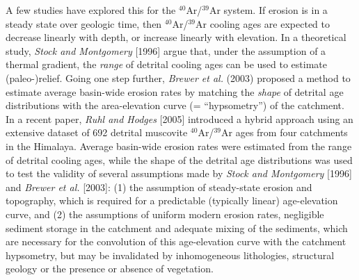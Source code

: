 \documentclass[12pt,twoside]{article}
\begin{document}
A few studies  have explored this for the  $^{40}$Ar/$^{39}$Ar system. 
If  erosion   is  in   a  steady  state   over  geologic   time,  then
$^{40}$Ar/$^{39}$Ar  cooling ages  are expected  to  decrease linearly
with  depth, or increase  linearly with  elevation.  In  a theoretical
study,  {\it  Stock  and  Montgomery}  [1996] argue  that,  under  the
assumption of a thermal gradient,  the {\it range} of detrital cooling
ages can be used to  estimate (paleo-)relief.  Going one step further,
{\it  Brewer et  al.}  (2003)  proposed a  method to  estimate average
basin-wide erosion rates  by matching the {\it shape}  of detrital age
distributions with the area-elevation  curve (= ``hypsometry'') of the
catchment.  In a recent paper, {\it Ruhl and Hodges} [2005] introduced
a hybrid approach using an extensive dataset of 692 detrital muscovite
$^{40}$Ar/$^{39}$Ar  ages  from  four  catchments  in  the  Himalaya.  
Average  basin-wide erosion  rates were  estimated from  the  range of
detrital  cooling   ages,  while  the   shape  of  the   detrital  age
distributions  was used to  test the  validity of  several assumptions
made by  {\it Stock  and Montgomery}  [1996] and {\it  Brewer et  al.} 
[2003]:  (1) the  assumption of  steady-state erosion  and topography,
which is  required for a predictable  (typically linear) age-elevation
curve,  and  (2) the  assumptions  of  uniform  modern erosion  rates,
negligible sediment  storage in the  catchment and adequate  mixing of
the  sediments,  which  are  necessary  for the  convolution  of  this
age-elevation  curve  with  the   catchment  hypsometry,  but  may  be
invalidated  by inhomogeneous lithologies,  structural geology  or the
presence or absence of vegetation.
\\
\end{document}
